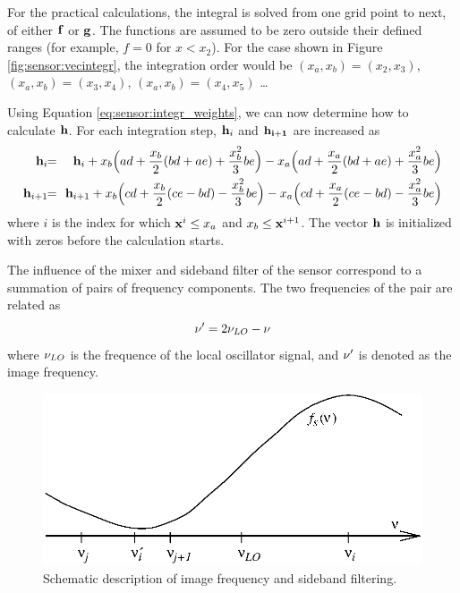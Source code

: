  For the practical calculations, the integral is solved from one grid
 point to next, of either $\mathbf{f}$ or $\mathbf{g}$. The functions are 
 assumed to be zero outside their defined ranges (for example, $f=0$ 
 for $x<x_2$).
 For the case
 shown in Figure \ref{fig:sensor:vecintegr}, the integration order would be
 $(x_a,x_b)=(x_2,x_3)$, $(x_a,x_b)=(x_3,x_4)$, $(x_a,x_b)=(x_4,x_5)$
 \ldots\
  
 Using Equation \ref{eq:sensor:integr_weights}, we can now determine how to
 calculate $\mathbf{h}$. For each integration step, $\mathbf{h}_i$ and
 $\mathbf{h_{i+1}}$ are increased as
 \begin{eqnarray}
    \mat{h}_i \!\! &=& \!\! \mat{h}_i +    
              x_b\Big(ad+\frac{x_b}{2}(bd+ae)+\frac{x_b^2}{3}be\Big) - 
              x_a\Big(ad+\frac{x_a}{2}(bd+ae)+\frac{x_a^2}{3}be\Big) 
    \nonumber \\
    \mat{h}_{i+1} \!\! &=& \!\! \mat{h}_{i+1} +
              x_b\Big(cd+\frac{x_b}{2}(ce-bd)-\frac{x_b^2}{3}be\Big) - 
              x_a\Big(cd+\frac{x_a}{2}(ce-bd)-\frac{x_a^2}{3}be\Big) 
    \nonumber
 \end{eqnarray}
 where $i$ is the index for which $\mathbf{x}^i \leq x_a$ and $x_b \leq
 \mathbf{x}^{i+1}$. The vector $\mathbf{h}$ is initialized with
 zeros before the calculation starts.



  
 The influence of the mixer and sideband filter of the sensor
 correspond to a summation of pairs of frequency components. The two
 frequencies of the pair are related as
 \begin{equation}
    \nu' = 2\nu_{LO}-\nu
 \end{equation}
 where $\nu_{LO}$ is the frequence of the local oscillator signal, and
 $\nu'$ is denoted as the image frequency.

 \begin{figure}[tb]
  \begin{center}
    \includegraphics*[width=0.9\hsize]{Figs/sideband.eps}
    \caption{Schematic description of image frequency and sideband filtering.}
   \label{fig:sensor:sideband} 
  \end{center} 
 \end{figure}
 
